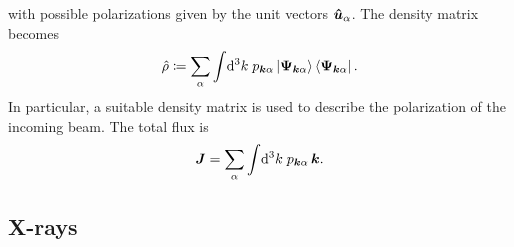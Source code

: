 with possible polarizations given by the unit vectors $\bm{\hat u}_\alpha$.
The density matrix becomes
\begin{equation}\label{ERho}
  \hat\rho
  \coloneqq \sum_\alpha \int\!\mathrm d^3k\; p_{{\bm{k}}\alpha}\ket{\bm{\Psi}_{{\bm{k}}\alpha}}\bra{\bm{\Psi}_{{\bm{k}}\alpha}}.
\end{equation}
In particular, a suitable density matrix is used to describe
the polarization of the incoming beam.
The total flux is
\begin{equation}\label{EFlux}
  \bm{J} = \sum_\alpha \int\!\mathrm d^3k\; p_{{\bm{k}}\alpha}\, {\bm{k}}.
\end{equation}
%
%
%

%
%

\subsection{X-rays}\label{SXwave}

%
%

